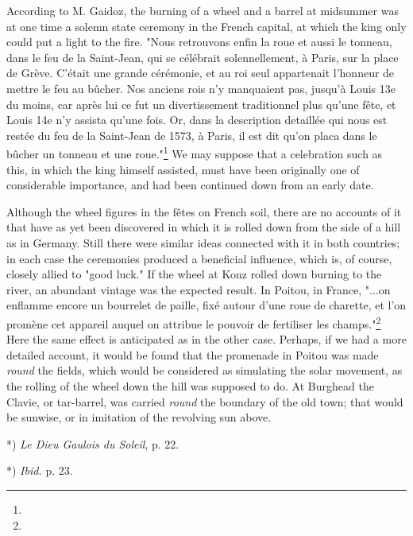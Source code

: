 \documentclass[a4paper, 11pt, oneside, polutonikogreek, english]{article}
\begin{document}
According to M. Gaidoz, the burning of a wheel and a barrel at midsummer was at one time a solemn state ceremony in the French capital, at which the king only could put a light to the fire. "Nous retrouvons enfin la roue et aussi le tonneau, dans le feu de la Saint-Jean, qui se célébrait solennellement, à Paris, sur la place de Grève. C'était une grande cérémonie, et au roi seul appartenait l'honneur de mettre le feu au bûcher. Nos anciens rois n'y manquaient pas, jusqu'à Louis 13e du moins, car après lui ce fut un divertissement traditionnel plus qu'une fête, et Louis 14e n'y assista qu'une fois. Or, dans la description detaillée qui nous est restée du feu de la Saint-Jean de 1573, à Paris, il est dit qu'on placa dans le bûcher un tonneau et une roue."\footnote{} We may suppose that a celebration such as this, in which the king himself assisted, must have been originally one of considerable importance, and had been continued down from an early date.

Although the wheel figures in the fêtes on French soil, there are no accounts of it that have as yet been discovered in which it is rolled down from the side of a hill as in Germany. Still there were similar ideas connected with it in both countries; in each case the ceremonies produced a beneficial influence, which is, of course, closely allied to "good luck." If the wheel at Konz rolled down burning to the river, an abundant vintage was the expected result. In Poitou, in France, "...on enflamme encore un bourrelet de paille, fixé autour d'une roue de charette, et l'on promène cet appareil auquel on attribue le pouvoir de fertiliser les champs."\footnote{} Here the same effect is anticipated as in the other case. Perhaps, if we had a more detailed account, it would be found that the promenade in Poitou was made \emph{round} the fields, which would be considered as simulating the solar movement, as the rolling of the wheel down the hill was supposed to do. At Burghead the Clavie, or tar-barrel, was carried \emph{round} the boundary of the old town; that would be sunwise, or in imitation of the revolving sun above.

*) \emph{Le Dieu Gaulois du Soleil}, p. 22.

*) \emph{Ibid.} p. 23.
\end{document}
